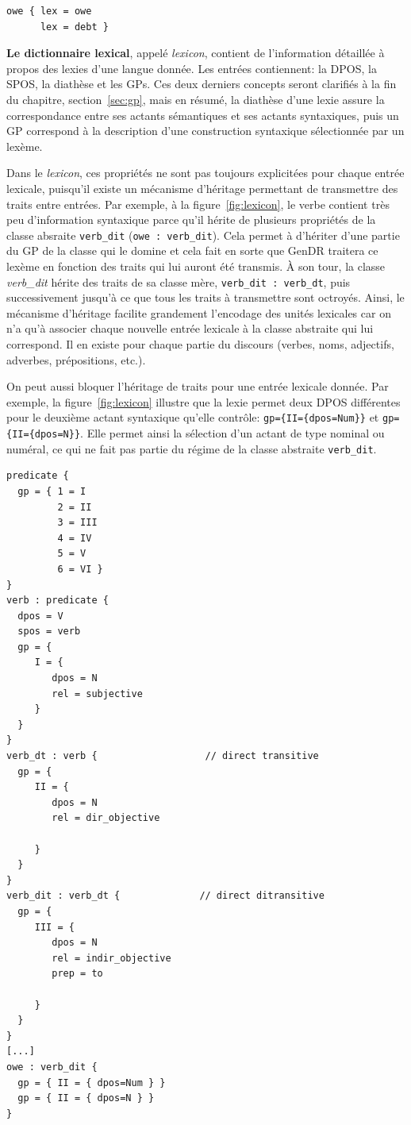 \begin{lstlisting}[language=mate, caption=Échantillon du \emph{semanticon}, label=fig:semanticon]
owe { lex = owe
      lex = debt }
\end{lstlisting}

\textbf{Le dictionnaire lexical}, appelé \emph{lexicon}, contient de l'information détaillée à propos des lexies d'une langue donnée. Les entrées contiennent: la \ac{DPOS}, la \ac{SPOS}, la diathèse et les \acp{GP}. Ces deux derniers concepts seront clarifiés à la fin du chapitre, section~\ref{sec:gp}, mais en résumé, la diathèse d'une lexie assure la correspondance entre ses actants sémantiques et ses actants syntaxiques, puis un \ac{GP} correspond à la description d'une construction syntaxique sélectionnée par un lexème.

Dans le \emph{lexicon}, ces propriétés ne sont pas toujours explicitées pour chaque entrée lexicale, puisqu'il existe un mécanisme d'héritage permettant de transmettre des traits entre entrées. Par exemple, à la figure~\ref{fig:lexicon}, le verbe  contient très peu d'information syntaxique parce qu'il hérite de plusieurs propriétés de la classe absraite \texttt{verb\_dit} (\lstinline|owe : verb_dit|). Cela permet à  d'hériter d'une partie du \ac{GP} de la classe qui le domine et cela fait en sorte que GenDR traitera ce lexème en fonction des traits qui lui auront été transmis. À son tour, la classe \emph{verb\_dit} hérite des traits de sa classe mère, \lstinline|verb_dit : verb_dt|, puis successivement jusqu'à ce que tous les traits à transmettre sont octroyés. Ainsi, le mécanisme d'héritage facilite grandement l'encodage des unités lexicales car on n'a qu'à associer chaque nouvelle entrée lexicale à la classe abstraite qui lui correspond. Il en existe pour chaque partie du discours (verbes, noms, adjectifs, adverbes, prépositions, etc.).

On peut aussi bloquer l'héritage de traits pour une entrée lexicale donnée. Par exemple, la figure~\ref{fig:lexicon} illustre que la lexie  permet deux \ac{DPOS} différentes pour le deuxième actant syntaxique qu'elle contrôle: \lstinline!gp={II={dpos=Num}}! et \lstinline!gp={II={dpos=N}}!. Elle permet ainsi la sélection d'un actant de type nominal ou numéral, ce qui ne fait pas partie du régime de la classe abstraite \texttt{verb\_dit}.

\begin{lstlisting}[language=mate, caption = Échantillon du \emph{lexicon}, label=fig:lexicon]
predicate {
  gp = { 1 = I
         2 = II
         3 = III
         4 = IV
         5 = V
         6 = VI }
}
verb : predicate {
  dpos = V
  spos = verb
  gp = {
     I = {
        dpos = N
        rel = subjective
     }
  }
}
verb_dt : verb {                   // direct transitive
  gp = {
     II = {
        dpos = N
        rel = dir_objective

     }
  }
}
verb_dit : verb_dt {              // direct ditransitive
  gp = {
     III = {
        dpos = N
        rel = indir_objective
        prep = to  

     }
  }
}
[...]
owe : verb_dit {
  gp = { II = { dpos=Num } }
  gp = { II = { dpos=N } }
}
\end{lstlisting}


